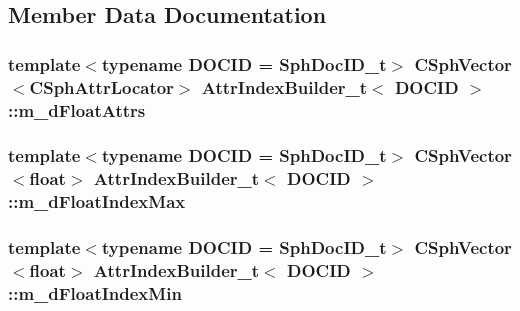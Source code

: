 \subsection{Member Data Documentation}
\hypertarget{classAttrIndexBuilder__t_abfa55e87fb3522a3da3e1618aa735ed2}{
\subsubsection[{m\-\_\-d\-Float\-Attrs}]{\setlength{\rightskip}{0pt plus 5cm}template$<$typename D\-O\-C\-I\-D  = Sph\-Doc\-I\-D\-\_\-t$>$ {\bf C\-Sph\-Vector}$<${\bf C\-Sph\-Attr\-Locator}$>$ {\bf Attr\-Index\-Builder\-\_\-t}$<$ D\-O\-C\-I\-D $>$\-::m\-\_\-d\-Float\-Attrs\hspace{0.3cm}{\ttfamily [private]}}}\label{classAttrIndexBuilder__t_abfa55e87fb3522a3da3e1618aa735ed2}
\hypertarget{classAttrIndexBuilder__t_af8a895727cac205bac709a9dc90ed8fe}{
\subsubsection[{m\-\_\-d\-Float\-Index\-Max}]{\setlength{\rightskip}{0pt plus 5cm}template$<$typename D\-O\-C\-I\-D  = Sph\-Doc\-I\-D\-\_\-t$>$ {\bf C\-Sph\-Vector}$<${\bf float}$>$ {\bf Attr\-Index\-Builder\-\_\-t}$<$ D\-O\-C\-I\-D $>$\-::m\-\_\-d\-Float\-Index\-Max\hspace{0.3cm}{\ttfamily [private]}}}\label{classAttrIndexBuilder__t_af8a895727cac205bac709a9dc90ed8fe}
\hypertarget{classAttrIndexBuilder__t_a863127f1f79a220a50f7b7592e356776}{
\subsubsection[{m\-\_\-d\-Float\-Index\-Min}]{\setlength{\rightskip}{0pt plus 5cm}template$<$typename D\-O\-C\-I\-D  = Sph\-Doc\-I\-D\-\_\-t$>$ {\bf C\-Sph\-Vector}$<${\bf float}$>$ {\bf Attr\-Index\-Builder\-\_\-t}$<$ D\-O\-C\-I\-D $>$\-::m\-\_\-d\-Float\-Index\-Min\hspace{0.3cm}{\ttfamily [private]}}}\label{classAttrIndexBuilder__t_a863127f1f79a220a50f7b7592e356776}
